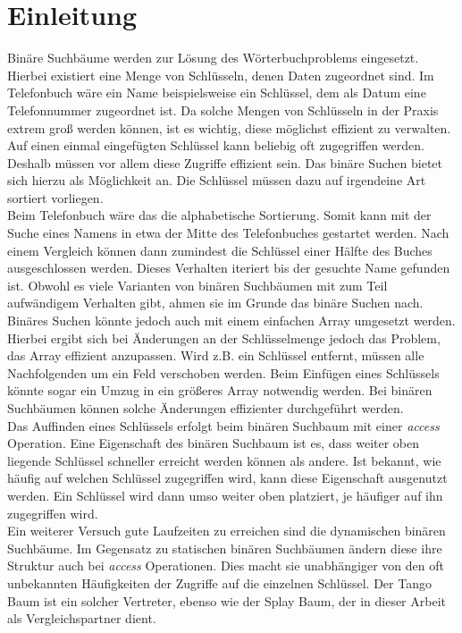 \documentclass[a4paper,12pt]{article}
\begin{document}
\newpage
\section{Einleitung}
Binäre Suchbäume werden zur Lösung des Wörterbuchproblems eingesetzt. Hierbei existiert eine Menge von Schlüsseln, denen Daten zugeordnet sind. Im Telefonbuch wäre ein Name beispielsweise ein Schlüssel, dem als Datum eine Telefonnummer zugeordnet ist. Da solche Mengen von Schlüsseln in der Praxis extrem groß werden können, ist es wichtig, diese möglichst effizient zu verwalten. Auf einen einmal eingefügten Schlüssel kann beliebig oft zugegriffen werden. Deshalb müssen vor allem diese Zugriffe effizient sein. Das binäre Suchen bietet sich hierzu als Möglichkeit an. Die Schlüssel müssen dazu auf irgendeine Art sortiert vorliegen.\\ Beim Telefonbuch wäre das die alphabetische Sortierung. Somit kann mit der Suche eines Namens in etwa der Mitte des Telefonbuches gestartet werden. Nach einem Vergleich können dann zumindest die Schlüssel einer Hälfte des Buches ausgeschlossen werden. Dieses Verhalten iteriert bis der gesuchte Name gefunden ist. Obwohl es viele Varianten von binären Suchbäumen mit zum Teil aufwändigem Verhalten gibt, ahmen sie im Grunde das binäre Suchen nach.\\
Binäres Suchen könnte jedoch auch mit einem einfachen Array umgesetzt werden. Hierbei ergibt sich bei Änderungen an der Schlüsselmenge jedoch das Problem, das Array effizient anzupassen. Wird z.B. ein Schlüssel entfernt, müssen alle Nachfolgenden um ein Feld verschoben werden. Beim Einfügen eines Schlüssels könnte sogar ein Umzug in ein größeres Array notwendig werden. Bei binären Suchbäumen können solche Änderungen effizienter durchgeführt werden.\\ 
Das Auffinden eines Schlüssels erfolgt beim binären Suchbaum  mit einer \mbox{\textit{access}} Operation.  Eine Eigenschaft des binären Suchbaum ist es, dass weiter oben liegende Schlüssel schneller erreicht werden können als andere. Ist bekannt, wie häufig auf welchen Schlüssel zugegriffen wird, kann diese Eigenschaft ausgenutzt werden. Ein Schlüssel wird dann umso weiter oben platziert, je häufiger auf ihn zugegriffen wird. \\
Ein weiterer Versuch gute Laufzeiten zu erreichen sind die dynamischen binären Suchbäume. Im Gegensatz zu statischen binären Suchbäumen ändern diese ihre Struktur auch bei \textit{access} Operationen. Dies macht sie unabhängiger von den oft unbekannten Häufigkeiten der Zugriffe auf die einzelnen Schlüssel. Der Tango Baum ist ein solcher Vertreter, ebenso wie der Splay Baum, der in dieser Arbeit als Vergleichspartner dient.
\end{document}
